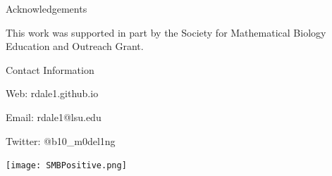 \documentclass[final]{beamer}
\newlength{\sepwid}
\newlength{\onecolwid}
\newlength{\twocolwid}
\begin{document}
\begin{frame}[t]
\begin{columns}[t]
\begin{column}{\twocolwid}
\begin{columns}[t,totalwidth=\twocolwid]
\begin{column}{\onecolwid}
\vspace{-1cm}
\begin{block}{Acknowledgements}
	
	\small{This work was supported in part by the Society for Mathematical Biology Education and Outreach Grant. } \\
	
\end{block}


\begin{alertblock}{Contact Information}
	
	\begin{itemize}
		\small{
			\item Web: {rdale1.github.io}
			\item Email: {rdale1@lsu.edu}
			\item Twitter: @b10\_m0del1ng}
	\end{itemize}
	
\end{alertblock}


\centering
		\texttt{[image: SMBPositive.png]}



	
	




\end{column} %

\end{columns} %

\end{column} %

\begin{column}{\sepwid}\end{column} %


\end{columns}
\end{frame}
\end{document}
